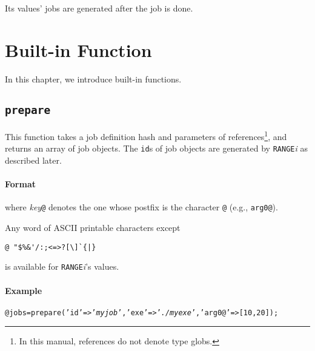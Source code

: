 \documentclass[a4paper,10pt]{report}
\begin{document}
Its values' jobs are generated after the job is done.

\chapter{Built-in Function}\label{chapfun}

In this chapter, we introduce built-in functions.

\def\format{Format}
\def\example{Example}
\def\advanced{Advanced}

\section{\texttt{prepare}}\label{sec:prepare}

This function takes a job definition hash and parameters of
references\footnote{In this manual, references do not denote type
globs.}, and returns an array of job objects.  The \texttt{id}s of job
objects are generated by \texttt{RANGE}\textit{i} as described later.

\subsubsection{\format}

\vspace{\baselineskip}
\noindent
where \textit{key}\texttt{@} denotes the one whose postfix is the
character \texttt{@} (e.g., \texttt{arg0@}).

Any word of ASCII printable characters except
\begin{center}
\verb*+@ "$%&'/:;<=>?[\]`{|}+        %
\end{center}
is available for \texttt{RANGE}\textit{i}'s values.

\subsubsection{\example}

\begin{boxnote}
\begin{alltt}
@jobs = prepare('id' => '\textit{myjob}', 'exe' => '\textit{./myexe}', 'arg0@' => [10,20]);
\end{alltt}
\end{boxnote}
\vspace{\baselineskip}
\end{document}

